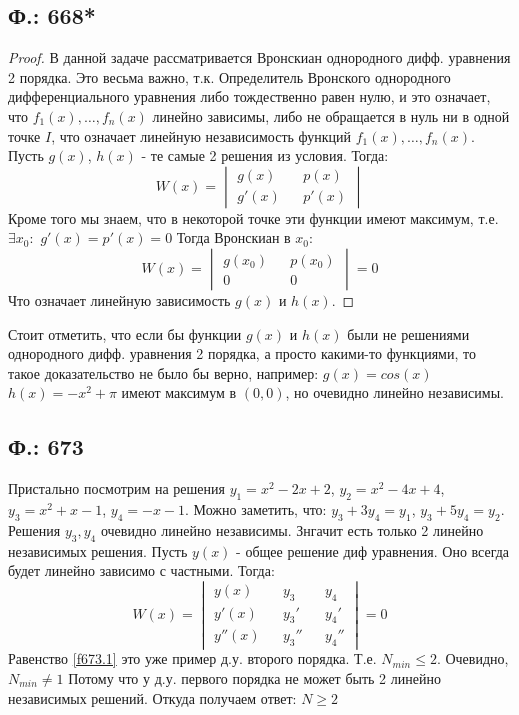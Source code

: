 \documentclass{article}
\begin{document}
 \subsection{Ф.: 668*}
 \begin{proof}

 В данной задаче рассматривается Вронскиан однородного дифф. уравнения 2 порядка. Это весьма важно, т.к. Определитель Вронского однородного дифференциального уравнения либо тождественно равен нулю, и это означает, что $f_{1}(x),\ldots ,f_{n}(x)$ линейно зависимы, либо не обращается в нуль ни в одной точке $I$, что означает линейную независимость функций $ f_{1}(x),\ldots ,f_{n}(x)$. Пусть $g(x)$, $h(x)$ - те самые 2 решения из условия. Тогда:
 \begin{equation}
     W(x)=
     \begin{vmatrix}
      g(x) && p(x) \\
      g'(x) && p'(x)
     \end{vmatrix}
 \end{equation}
Кроме того мы знаем, что в некоторой точке эти функции имеют максимум, т.е. $\exists x_0:$ $g'(x) = p'(x) = 0$ Тогда Вронскиан в $x_0$:
 \begin{equation}
     W(x)=
     \begin{vmatrix}
      g(x_0) && p(x_0) \\
      0 && 0
     \end{vmatrix}
     =0
 \end{equation}
 Что означает линейную зависимость $g(x)$ и $h(x)$.
\end{proof}
Стоит отметить, что если бы функции $g(x)$ и $h(x)$ были не решениями однородного дифф. уравнения 2 порядка, а просто какими-то функциями, то такое доказательство не было бы верно, например: $g(x)=cos(x)$ $h(x)=-x^2+\pi$ имеют максимум в $(0,0)$, но очевидно линейно независимы.
\subsection{Ф.: 673}
Пристально посмотрим на решения $y_1=x^2-2x+2$, $y_2=x^2-4x+4$, $y_3=x^2+x-1$, $y_4=-x-1$. Можно заметить, что: $y_3+3 y_4=y_1$, $y_3+5 y_4=y_2$. Решения $y_3, y_4$ очевидно линейно независимы. Знгачит есть только 2 линейно независимых решения. Пусть $y(x)$ - общее решение диф уравнения. Оно всегда будет линейно зависимо с частными. Тогда:
\begin{equation}\label{f673.1}
    W(x)=
    \begin{vmatrix}
     y(x)&& y_3 && y_4\\
     y'(x)&& y_3' && y_4'\\
     y''(x)&& y_3'' && y_4''
    \end{vmatrix}
    =0
\end{equation}
Равенство \ref{f673.1} это уже пример д.у. второго порядка. Т.е. $N_{min} \leq 2$. Очевидно, $N_{min} \neq 1$ Потому что у д.у. первого порядка не может быть 2 линейно независимых решений. Откуда получаем ответ: $N\geq 2$
\end{document}

